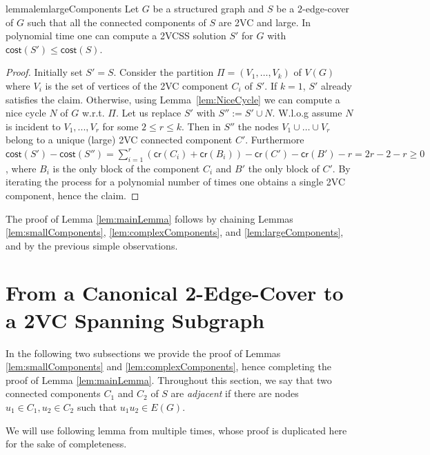 \documentclass{article}
\newcommand{\cost}{\mathsf{cost}}
\newcommand{\credit}{\mathsf{cr}}
\begin{document}
\begin{restatable}{lemma}{lemlargeComponents}\label{lem:largeComponents}
    Let $G$ be a structured graph and $S$ be a $2$-edge-cover of $G$ such that all the connected components of $S$ are 2VC and large. In polynomial time one can compute a 2VCSS solution $S'$ for $G$ with $\cost(S')\leq \cost(S)$.
\end{restatable}
\begin{proof}
    Initially set $S'=S$. Consider the partition $\Pi=(V_1,\ldots,V_k)$ of $V(G)$ where $V_i$ is the set of vertices of the 2VC component $C_i$ of $S'$. If $k=1$, $S'$ already satisfies the claim. Otherwise, using Lemma~\ref{lem:NiceCycle} we can compute a nice cycle $N$ of $G$ w.r.t. $\Pi$. Let us replace $S'$ with $S'':=S'\cup N$. W.l.o.g  assume $N$ is incident to $V_1,...,V_r$ for some $2\le r\le k$. Then in $S''$ the nodes   $V_1\cup \ldots \cup V_r$ belong to a unique (large) 2VC connected component $C'$. Furthermore $\cost(S')-\cost(S'')=\sum_{i=1}^r(\credit(C_i)+\credit(B_i))-\credit(C')-\credit(B')-r=2r-2-r\ge 0$, where $B_i$ is the only block of the component $C_i$ and $B'$ the only block of $C'$. By iterating the process for a polynomial number of times one obtains a single 2VC component, hence the claim.
\end{proof}

The proof of Lemma \ref{lem:mainLemma} follows by chaining Lemmas \ref{lem:smallComponents}, \ref{lem:complexComponents}, and \ref{lem:largeComponents}, and by the previous simple observations.

\section{From a Canonical 2-Edge-Cover to a 2VC Spanning Subgraph}
\label{sec:2VCSS}

In the following two subsections we provide the proof of Lemmas \ref{lem:smallComponents} and \ref{lem:complexComponents}, hence completing the proof of Lemma \ref{lem:mainLemma}. Throughout this section, we say that two connected components $C_1$ and $C_2$ of $S$ are \emph{adjacent} if there are nodes $u_1\in C_1, u_2\in C_2$ such that $u_1u_2\in E(G)$.

We will use following lemma from \cite{GGJ23} multiple times, whose proof is duplicated here for the sake of completeness.
\end{document}
